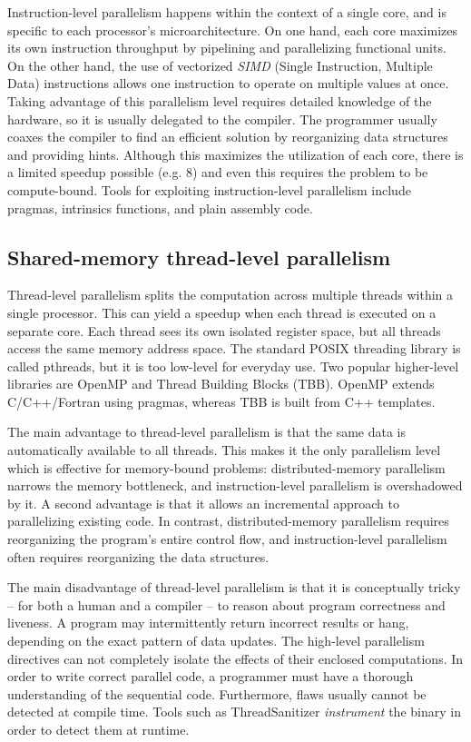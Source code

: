 \documentclass[conference, a4paper]{IEEEtran-modified}
\begin{document}
    Instruction-level parallelism happens within the context of a single core, and is specific to each processor's microarchitecture. On one hand, each core maximizes its own instruction throughput by pipelining and parallelizing functional units. On the other hand, the use of vectorized \emph{SIMD} (Single Instruction, Multiple Data) instructions allows one instruction to operate on multiple values at once. Taking advantage of this parallelism level requires detailed knowledge of the hardware, so it is usually delegated to the compiler. The programmer usually coaxes the compiler to find an efficient solution by reorganizing data structures and providing hints. Although this maximizes the utilization of each core, there is a limited speedup possible (e.g. 8) and even this requires the problem to be compute-bound. Tools for exploiting instruction-level parallelism include pragmas, intrinsics functions, and plain assembly code.


\subsection{Shared-memory thread-level parallelism}

    Thread-level parallelism splits the computation across multiple threads within a single processor. This can yield a speedup when each thread is executed on a separate core. Each thread sees its own isolated register space, but all threads access the same memory address space. The standard POSIX threading library is called pthreads, but it is too low-level for everyday use. Two popular higher-level libraries are OpenMP and Thread Building Blocks (TBB). OpenMP extends C/C++/Fortran using pragmas, whereas TBB is built from C++ templates.

    The main advantage to thread-level parallelism is that the same data is automatically available to all threads. This makes it the only parallelism level which is effective for memory-bound problems: distributed-memory parallelism narrows the memory bottleneck, and instruction-level parallelism is overshadowed by it. A second advantage is that it allows an incremental approach to parallelizing existing code. In contrast, distributed-memory parallelism requires reorganizing the program's entire control flow, and instruction-level parallelism often requires reorganizing the data structures. 

    The main disadvantage of thread-level parallelism is that it is conceptually tricky -- for both a human and a compiler -- to reason about program correctness and liveness. A program may intermittently return incorrect results or hang, depending on the exact pattern of data updates. The high-level parallelism directives can not completely isolate the effects of their enclosed computations. In order to write correct parallel code, a programmer must have a thorough understanding of the sequential code. Furthermore, flaws usually cannot be detected at compile time. Tools such as ThreadSanitizer \emph{instrument} the binary in order to detect them at runtime.
\end{document}
